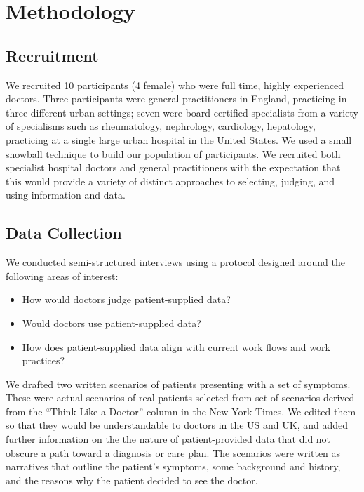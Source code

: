 \documentclass{sigchi}
\begin{document}
\section{Methodology}
\subsection{Recruitment}
We recruited 10 participants (4 female) who were full time, highly experienced doctors.  Three participants were general practitioners in England, practicing in three different urban settings; seven were board-certified specialists from a variety of specialisms such as rheumatology, nephrology, cardiology, hepatology, practicing at a single large urban hospital in the United States.  We used a small snowball technique to build our population of participants.   We recruited both specialist hospital doctors and general practitioners with the expectation that this would provide a variety of distinct approaches to selecting, judging, and using information and data.

\subsection{Data Collection}
We conducted semi-structured interviews using a protocol designed around the following areas of interest:
\begin{itemize}
\item How would doctors judge patient-supplied data?
\item Would doctors use patient-supplied data?
\item How does patient-supplied data align with current work flows and work practices?
\end{itemize}
We drafted two written scenarios of patients presenting with a set of symptoms.  These were actual scenarios of real patients selected from set of scenarios derived from the “Think Like a Doctor” column in the New York Times.  We edited them so that they would be understandable to doctors in the US and UK, and added further information on the the nature of patient-provided data that did not obscure a path toward a diagnosis or care plan.  The scenarios were written as narratives that outline the patient’s symptoms, some background and history, and the reasons why the patient decided to see the doctor.  
\end{document}
